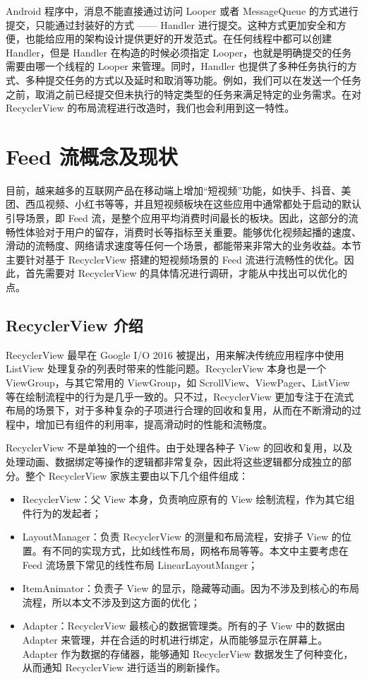 Android 程序中，消息不能直接通过访问 Looper 或者 MessageQueue 的方式进行提交，只能通过封装好的方式 —— Handler 进行提交。这种方式更加安全和方便，也能给应用的架构设计提供更好的开发范式。在任何线程中都可以创建 Handler，但是 Handler 在构造的时候必须指定 Looper，也就是明确提交的任务需要由哪一个线程的 Looper 来管理\cite{fan2018efficiently}。同时，Handler 也提供了多种任务执行的方式、多种提交任务的方式以及延时和取消等功能。例如，我们可以在发送一个任务之前，取消之前已经提交但未执行的特定类型的任务来满足特定的业务需求。在对 RecyclerView 的布局流程进行改造时，我们也会利用到这一特性。

\section{Feed 流概念及现状}

目前，越来越多的互联网产品在移动端上增加“短视频”功能，如快手、抖音、美团、西瓜视频、小红书等等，并且短视频板块在这些应用中通常都处于启动的默认引导场景，即 Feed 流，是整个应用平均消费时间最长的板块。因此，这部分的流畅性体验对于用户的留存，消费时长等指标至关重要。能够优化视频起播的速度、滑动的流畅度、网络请求速度等任何一个场景，都能带来非常大的业务收益。本节主要针对基于 RecyclerView 搭建的短视频场景的 Feed 流进行流畅性的优化。因此，首先需要对 RecyclerView 的具体情况进行调研，才能从中找出可以优化的点。

\subsection{RecyclerView 介绍}

RecyclerView 最早在 Google I/O 2016 被提出，用来解决传统应用程序中使用 ListView 处理复杂的列表时带来的性能问题。RecyclerView 本身也是一个 ViewGroup，与其它常用的 ViewGroup，如 ScrollView、ViewPager、ListView 等在绘制流程中的行为是几乎一致的\cite{mawlood2022listview}。只不过，RecyclerView 更加专注于在流式布局的场景下，对于多种复杂的子项进行合理的回收和复用，从而在不断滑动的过程中，增加已有组件的利用率，提高滑动时的性能和流畅度。

RecyclerView 不是单独的一个组件。由于处理各种子 View 的回收和复用，以及处理动画、数据绑定等操作的逻辑都非常复杂，因此将这些逻辑都分成独立的部分。整个 RecyclerView 家族主要由以下几个组件组成：

\begin{itemize}
    \item RecyclerView：父 View 本身，负责响应原有的 View 绘制流程，作为其它组件行为的发起者；
    \item LayoutManager：负责 RecyclerView 的测量和布局流程，安排子 View 的位置。有不同的实现方式，比如线性布局，网格布局等等。本文中主要考虑在 Feed 流场景下常见的线性布局 LinearLayoutManger；
    \item ItemAnimator：负责子 View 的显示，隐藏等动画。因为不涉及到核心的布局流程，所以本文不涉及到这方面的优化；
    \item Adapter：RecyclerView 最核心的数据管理类。所有的子 View 中的数据由 Adapter 来管理，并在合适的时机进行绑定，从而能够显示在屏幕上。Adapter 作为数据的存储器，能够通知 RecyclerView 数据发生了何种变化，从而通知 RecyclerView 进行适当的刷新操作。
\end{itemize}

